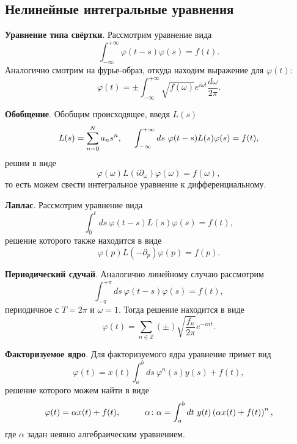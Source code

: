 \subsection*{Нелинейные интегральные уравнения}

\textbf{Уравнение типа свёртки}. Рассмотрим уравнение вида
\begin{equation}
	\int_{-\infty}^{+\infty} \varphi(t-s) \varphi(s) = f(t).
\end{equation}
Аналогично смотрим на фурье-образ, откуда находим выражение для $\varphi(t)$:
\begin{equation}
	\varphi(t) = \pm \int_{-\infty}^{+\infty} \sqrt{f(\omega)} e^{i \omega t} \frac{d \omega}{2\pi}.
\end{equation}

\textbf{Обобщение}. 
Обобщим происходящее, введя $L(s)$
\begin{equation}
	L(s) = \sum_{n=0}^{N} a_n s^n,
	\hspace{5 mm} 
\int_{-\infty}^{+\infty} ds\ \varphi(t-s) L(s) \varphi(s) = f(t),
\end{equation}
решим в виде
\begin{equation}
	\varphi(\omega) L(i \partial_\omega) \varphi(\omega) = f(\omega),
\end{equation}
то есть можем свести интегральное уравнение к дифференциальному.


\textbf{Лаплас}. Рассмотрим уравнение вида
\begin{equation*}
	\int_{0}^{t} ds\ \varphi(t-s) L(s) \varphi(s) = f(t),
\end{equation*}
решение которого также находится в виде
\begin{equation*}
	\varphi(p) L(-\partial_p) \varphi(p) = f(p).
\end{equation*}


\textbf{Периодический сдучай}. Аналогично линейному случаю рассмотрим
\begin{equation*}
	\int_{-\pi}^{+\pi} ds\ \varphi(t-s) \varphi(s) = f(t),
\end{equation*}
периодичное с $T=2\pi$ и $\omega = 1$. Тогда решение находится в виде
\begin{equation*}
	\varphi(t) = \sum_{n \in \mathbb{Z}} (\pm) \sqrt{\frac{f_n}{2\pi}} e^{-int}.
\end{equation*}


\textbf{Факторизуемое ядро}. Для факторизуемого ядра уравнение примет вид
\begin{equation*}
	\varphi(t) =  x(t)\int_{a}^{b} ds\ \varphi^n (s) y(s) + f(t),
\end{equation*}
решение которого можем найти в виде
\begin{equation*}
	\varphi(t) = \alpha x(t) + f(t),
	\hspace{10 mm} 
	\alpha \colon  \alpha = \int_{a}^{b} dt\ y(t) \left(
		\alpha x(t) + f(t)
	\right)^n,
\end{equation*}
где $\alpha$ задан неявно алгебраическим уравнением.

